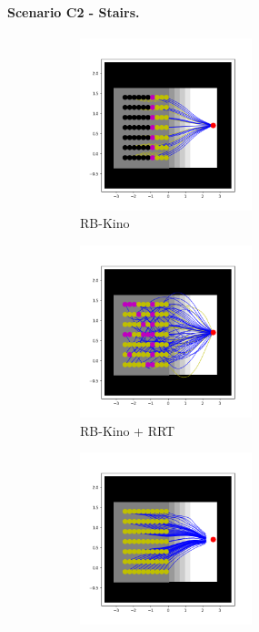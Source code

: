 
\paragraph{Scenario C2 - Stairs.\label{sec:cp-sb:par:stairs}}
\begin{figure}[h]
    \captionsetup[subfigure]{justification=centering}
    \centering
    \begin{subfigure}[t]{0.48\linewidth}
        \includegraphics[width=\textwidth, height=5cm]{Figures/Chapter_CPSB/stairs_kino.png}
        \caption{RB-Kino\label{fig:cp-sb:stairs_sm_kino}}
    \end{subfigure}
    \begin{subfigure}[t]{0.48\linewidth}
        \includegraphics[width=\textwidth, height=5cm]{Figures/Chapter_CPSB/stairs_kino_rrt.png}
        \caption{RB-Kino + RRT\label{fig:cp-sb:stairs_sm_kino_rrt}}
    \end{subfigure}
    \begin{subfigure}[t]{0.48\linewidth}
        \includegraphics[width=\textwidth, height=5cm]{Figures/Chapter_CPSB/stairs_leas_p1.png}

\end{subfigure}
\end{figure}
